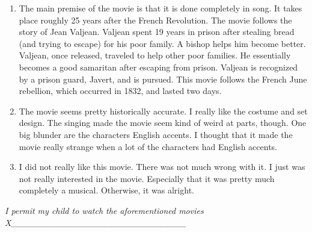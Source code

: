 \documentclass[12pt]{article}
\begin{document}
\begin{enumerate}

\item The main premise of the movie is that it is done completely in song. It takes place roughly 25 years after the French Revolution. The movie follows the story of Jean Valjean. Valjean spent 19 years in prison after stealing bread (and trying to escape) for his poor family. A bishop helps him become better. Valjean, once released, traveled to help other poor families. He essentially becomes a good samaritan after escaping from prison. Valjean is recognized by a prison guard, Javert, and is pursued. This movie follows the French June rebellion, which occurred in 1832, and lasted two days.

\item The movie seems pretty historically accurate. I really like the costume and set design. The singing made the movie seem kind of weird at parts, though. One big blunder are the characters English accents. I thought that it made the movie really strange when a lot of the characters had English accents.

\item I did not really like this movie. There was not much wrong with it. I just was not really interested in the movie. Especially that it was pretty much completely a musical. Otherwise, it was alright.

\end{enumerate}
\begin{center}
\textit{I permit my child to watch the aforementioned movies\\ X\_\_\_\_\_\_\_\_\_\_\_\_\_\_\_\_\_\_\_\_\_\_\_\_\_\_\_\_}
\end{center}
\end{document}
